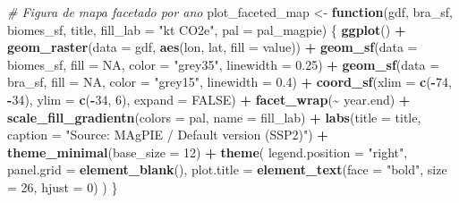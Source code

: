 \documentclass[
]{article}
\newenvironment{Shaded}{\begin{snugshade}}{\end{snugshade}}
\newcommand{\AttributeTok}[1]{\textcolor[rgb]{0.13,0.29,0.53}{#1}}
\newcommand{\CommentTok}[1]{\textcolor[rgb]{0.56,0.35,0.01}{\textit{#1}}}
\newcommand{\ConstantTok}[1]{\textcolor[rgb]{0.56,0.35,0.01}{#1}}
\newcommand{\ControlFlowTok}[1]{\textcolor[rgb]{0.13,0.29,0.53}{\textbf{#1}}}
\newcommand{\DecValTok}[1]{\textcolor[rgb]{0.00,0.00,0.81}{#1}}
\newcommand{\FloatTok}[1]{\textcolor[rgb]{0.00,0.00,0.81}{#1}}
\newcommand{\FunctionTok}[1]{\textcolor[rgb]{0.13,0.29,0.53}{\textbf{#1}}}
\newcommand{\NormalTok}[1]{#1}
\newcommand{\OtherTok}[1]{\textcolor[rgb]{0.56,0.35,0.01}{#1}}
\newcommand{\SpecialCharTok}[1]{\textcolor[rgb]{0.81,0.36,0.00}{\textbf{#1}}}
\newcommand{\StringTok}[1]{\textcolor[rgb]{0.31,0.60,0.02}{#1}}
\begin{document}
\begin{Shaded}
\begin{Highlighting}[]
\CommentTok{\# Figura de mapa facetado por ano}
\NormalTok{plot\_faceted\_map }\OtherTok{\textless{}{-}} \ControlFlowTok{function}\NormalTok{(gdf, bra\_sf, biomes\_sf, title, }\AttributeTok{fill\_lab =} \StringTok{"kt CO2e"}\NormalTok{, }\AttributeTok{pal =}\NormalTok{ pal\_magpie) \{}
  \FunctionTok{ggplot}\NormalTok{() }\SpecialCharTok{+}
    \FunctionTok{geom\_raster}\NormalTok{(}\AttributeTok{data =}\NormalTok{ gdf, }\FunctionTok{aes}\NormalTok{(lon, lat, }\AttributeTok{fill =}\NormalTok{ value)) }\SpecialCharTok{+}
    \FunctionTok{geom\_sf}\NormalTok{(}\AttributeTok{data =}\NormalTok{ biomes\_sf, }\AttributeTok{fill =} \ConstantTok{NA}\NormalTok{, }\AttributeTok{color =} \StringTok{"grey35"}\NormalTok{, }\AttributeTok{linewidth =} \FloatTok{0.25}\NormalTok{) }\SpecialCharTok{+}
    \FunctionTok{geom\_sf}\NormalTok{(}\AttributeTok{data =}\NormalTok{ bra\_sf,    }\AttributeTok{fill =} \ConstantTok{NA}\NormalTok{, }\AttributeTok{color =} \StringTok{"grey15"}\NormalTok{, }\AttributeTok{linewidth =} \FloatTok{0.4}\NormalTok{) }\SpecialCharTok{+}
    \FunctionTok{coord\_sf}\NormalTok{(}\AttributeTok{xlim =} \FunctionTok{c}\NormalTok{(}\SpecialCharTok{{-}}\DecValTok{74}\NormalTok{, }\SpecialCharTok{{-}}\DecValTok{34}\NormalTok{), }\AttributeTok{ylim =} \FunctionTok{c}\NormalTok{(}\SpecialCharTok{{-}}\DecValTok{34}\NormalTok{, }\DecValTok{6}\NormalTok{), }\AttributeTok{expand =} \ConstantTok{FALSE}\NormalTok{) }\SpecialCharTok{+}
    \FunctionTok{facet\_wrap}\NormalTok{(}\SpecialCharTok{\textasciitilde{}}\NormalTok{ year.end) }\SpecialCharTok{+}
    \FunctionTok{scale\_fill\_gradientn}\NormalTok{(}\AttributeTok{colors =}\NormalTok{ pal, }\AttributeTok{name =}\NormalTok{ fill\_lab) }\SpecialCharTok{+}
    \FunctionTok{labs}\NormalTok{(}\AttributeTok{title =}\NormalTok{ title, }\AttributeTok{caption =} \StringTok{"Source: MAgPIE / Default version (SSP2)"}\NormalTok{) }\SpecialCharTok{+}
    \FunctionTok{theme\_minimal}\NormalTok{(}\AttributeTok{base\_size =} \DecValTok{12}\NormalTok{) }\SpecialCharTok{+}
    \FunctionTok{theme}\NormalTok{(}
      \AttributeTok{legend.position =} \StringTok{"right"}\NormalTok{,}
      \AttributeTok{panel.grid      =} \FunctionTok{element\_blank}\NormalTok{(),}
      \AttributeTok{plot.title      =} \FunctionTok{element\_text}\NormalTok{(}\AttributeTok{face =} \StringTok{"bold"}\NormalTok{, }\AttributeTok{size =} \DecValTok{26}\NormalTok{, }\AttributeTok{hjust =} \DecValTok{0}\NormalTok{)}
\NormalTok{    )}
\NormalTok{\}}


\end{Highlighting}
\end{Shaded}
\end{document}
